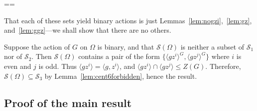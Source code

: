 \documentclass[11pt, a4paper]{amsart}
\makeatletter
\renewcommand{\proofname}{Proof}
\renewenvironment{proof}[1][\proofname]{\par
  \pushQED{\qed}  \normalfont \partopsep=\z@skip \topsep=\z@skip
  \trivlist
  \item[\hskip\labelsep
        \scshape
    #1\@addpunct{.}]\ignorespaces
}{  \popQED\endtrivlist\@endpefalse
}
\makeatother
\begin{document}
\begin{proof}
    That each of these sets yield binary actions is just Lemmas~\ref{lem:nogzi},~\ref{lem:gz}, and~\ref{lem:ggz}---we shall show that there are no others.

    Suppose the action of $G$ on $\Omega$ is binary, and that $\mathcal{S}(\Omega)$ is neither a subset of $\mathcal{S}_1$ nor of $\mathcal{S}_2$. Then $\mathcal{S}(\Omega)$ contains a pair of the form $\{\langle gz^i\rangle^G,\langle gz^{j}\rangle^G\}$ where $i$ is even and $j$ is odd. Thus $\langle gz^i\rangle=\langle g,z^i\rangle$, and $\langle gz^i\rangle\cap \langle gz^{j}\rangle\leq Z(G)$. Therefore, $\mathcal{S}(\Omega)\subseteq \mathcal{S}_3$ by Lemma~\ref{lem:cent6forbidden}, hence the result.
    \end{proof}


\subsection{Proof of the main result}
\end{document}

